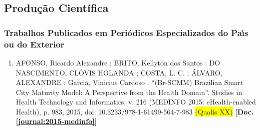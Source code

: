 \documentclass[a4paper,oneside,10pt]{article}
\begin{document}

\subsection{Produção Científica}
\vspace{0.3cm}


\subsubsection{Trabalhos Publicados em Peri\'{o}dicos Especializados do Pa\'{\i}s ou do Exterior}
\vspace{0.3cm}

\begin{enumerate}
\renewcommand{\labelenumi}{{\large\bfseries\arabic{enumi}.}}

\item AFONSO, Ricardo Alexandre ; BRITO, Kellyton dos Santos ; DO NASCIMENTO, CLÓVIS HOLANDA ; COSTA, L.  C. ; ÁLVARO, ALEXANDRE ; Garcia, Vinicius Cardoso . ``(Br-SCMM) Brazilian Smart City Maturity Model: A Perspective from the Health Domain''. Studies in Health Technology and Informatics, v. 216 (MEDINFO 2015: eHealth-enabled Health), p. 983, 2015, doi: 10.3233/978-1-61499-564-7-983 \colorbox{yellow}{(Qualis XX)} \textbf{[Doc. \ref{journal:2015-medinfo}]}

%
%
%


\end{enumerate}
\end{document}
